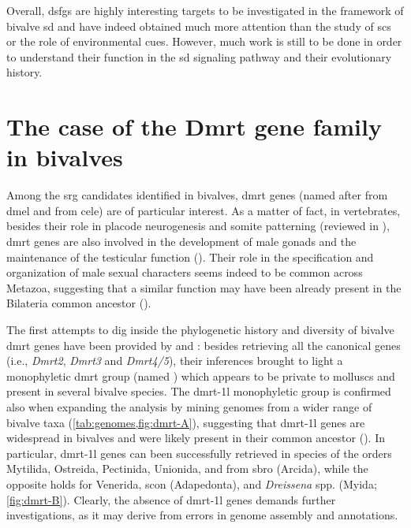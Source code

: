 Overall, \glspl{dsfg} are highly interesting targets to be investigated in the framework of bivalve \gls{sd} and have indeed obtained much more attention than the study of \glspl{sc} or the role of environmental cues. However, much work is still to be done in order to understand their function in the \gls{sd} signaling pathway and their evolutionary history.

\section{The case of the Dmrt gene family in bivalves}

Among the \gls{srg} candidates identified in bivalves, \gls{dmrt} genes (named after  from \gls{dmel} and  from \gls{cele}) are of particular interest. As a matter of fact, in vertebrates, besides their role in placode neurogenesis and somite patterning (reviewed in ), \gls{dmrt} genes are also involved in the development of male gonads and the maintenance of the testicular function (). Their role in the specification and organization of male sexual characters seems indeed to be common across Metazoa, suggesting that a similar function may have been already present in the Bilateria common ancestor ().

The first attempts to dig inside the phylogenetic history and diversity of bivalve \gls{dmrt} genes have been provided by  and : besides retrieving all the canonical genes (i.e., \textit{Dmrt2}, \textit{Dmrt3} and \textit{Dmrt4/5}), their inferences brought to light a monophyletic \gls{dmrt} group (named ) which appears to be private to molluscs and present in several bivalve species. The \gls{dmrt-1l} monophyletic group is confirmed also when expanding the analysis by mining genomes from a wider range of bivalve taxa (\cref{tab:genomes,fig:dmrt-A}), suggesting that \gls{dmrt-1l} genes are widespread in bivalves and were likely present in their common ancestor (). In particular, \gls{dmrt-1l} genes can been successfully retrieved in species of the orders Mytilida, Ostreida, Pectinida, Unionida, and from \gls{sbro} (Arcida), while the opposite holds for Venerida, \gls{scon} (Adapedonta), and \textit{Dreissena} spp. (Myida; \cref{fig:dmrt-B}). Clearly, the absence of \gls{dmrt-1l} genes demands further investigations, as it may derive from errors in genome assembly and annotations.

